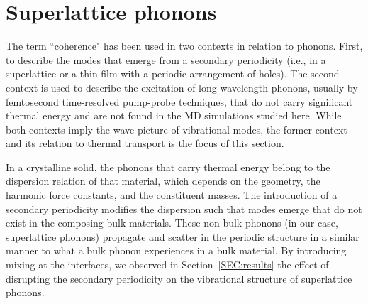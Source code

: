 \documentclass[aps,prb,preprint,preprintnumbers,amsmath,amssymb,floatfix,superscriptaddress]{revtex4}
\begin{document}
\begin{comment}
The noise in the contribution distribution at longer MFPs is consequence of the limited resolution of the Brillouin zone enforced by the MD domain. This has been observed in other mode by mode analysis techniques, such as the real space force constant extraction from DFT method used by Esfarjani, where the limited resolution manifested in a stepwise behavior of thermal conductivity accumulation function of bulk silicon. \cite{PhysRevB.84.085204} The linear behavior of the dispersion near the gamma point of the Brillouin zone and the $\omega^{-2}$ scaling of the lifetimes allowed for the contribution of these unresolved long-wavelength modes to be estimated. The linear extrapolation procedure used to predict bulk thermal conductivities \cite{PhysRevB.81.214305} was not used in previous superlattice studies \cite{doi:10.1021/nl202186y,Luckyanova16112012} and is not used here. The complicated dispersion [Fig.~\ref{fig:dispersion}(a-c)] does not guarantee that such an approach is viable, as such, understanding size effects in superlattices warrants further work.
\end{comment}

\section{Superlattice phonons}\label{SEC:sl_phon}

The term ``coherence" has been used in two contexts in relation to phonons. First, to describe the modes that emerge from a secondary periodicity (i.e., in a superlattice or a thin film with a periodic arrangement of holes\cite{doi:10.1021/nl102918q,PhysRevB.87.195301}). The second context is used to describe the excitation of long-wavelength phonons, usually by femtosecond time-resolved pump-probe techniques,\cite{PhysRevLett.73.740,PhysRevB.75.195309} that do not carry significant thermal energy and are not found in the MD simulations studied here. While both contexts imply the wave picture of vibrational modes, the former context and its relation to thermal transport is the focus of this section.

In a crystalline solid, the phonons that carry thermal energy belong to the dispersion relation of that material, which depends on the geometry, the harmonic force constants, and the constituent masses. The introduction of a secondary periodicity modifies the dispersion such that modes emerge that do not exist in the composing bulk materials. These non-bulk phonons (in our case, superlattice phonons) propagate and scatter in the periodic structure in a similar manner to what a bulk phonon experiences in a bulk material. By introducing mixing at the interfaces, we observed in Section~\ref{SEC:results} the effect of disrupting the secondary periodicity on the vibrational structure of superlattice phonons. %
\end{document}
